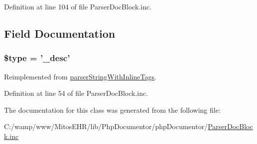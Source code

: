 \-Definition at line 104 of file \-Parser\-Doc\-Block.\-inc.




\subsection{\-Field \-Documentation}
\hypertarget{classparser_desc_a9a4a6fba2208984cabb3afacadf33919}{
\subsubsection[{\$type}]{\setlength{\rightskip}{0pt plus 5cm}\$type = '\-\_\-desc'}}\label{classparser_desc_a9a4a6fba2208984cabb3afacadf33919}


\-Reimplemented from \hyperlink{classparser_string_with_inline_tags_a9a4a6fba2208984cabb3afacadf33919}{parser\-String\-With\-Inline\-Tags}.



\-Definition at line 54 of file \-Parser\-Doc\-Block.\-inc.



\-The documentation for this class was generated from the following file\-:\begin{DoxyCompactItemize}
\item 
\-C\-:/wamp/www/\-Mitos\-E\-H\-R/lib/\-Php\-Documentor/php\-Documentor/\hyperlink{_parser_doc_block_8inc}{\-Parser\-Doc\-Block.\-inc}\end{DoxyCompactItemize}
